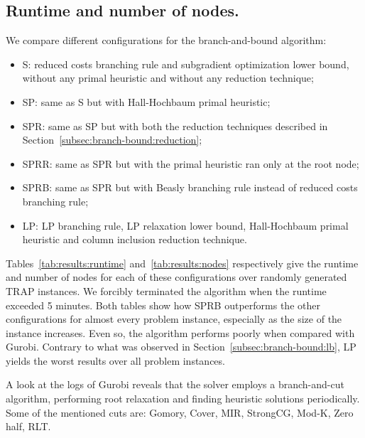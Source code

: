 \documentclass[runningheads]{llncs}
\begin{document}
\subsection{Runtime and number of nodes.} We compare different configurations for the branch-and-bound algorithm:
\begin{itemize}
  \item S: reduced costs branching rule and subgradient optimization lower bound, without any primal heuristic and without any reduction technique;
  \item SP: same as S but with Hall-Hochbaum primal heuristic;
  \item SPR: same as SP but with both the reduction techniques described in Section~\ref{subsec:branch-bound:reduction};
  \item SPRR: same as SPR but with the primal heuristic ran only at the root node;
  \item SPRB: same as SPR but with Beasly branching rule instead of reduced costs branching rule;
  \item LP: LP branching rule, LP relaxation lower bound, Hall-Hochbaum primal heuristic and column inclusion reduction technique.
\end{itemize}

Tables~\ref{tab:results:runtime} and~\ref{tab:results:nodes} respectively give the runtime and number of nodes for each of these configurations over randomly generated TRAP instances. We forcibly terminated the algorithm when the runtime exceeded 5 minutes. Both tables show how SPRB outperforms the other configurations for almost every problem instance, especially as the size of the instance increases. Even so, the algorithm performs poorly when compared with Gurobi. Contrary to what was observed in Section~\ref{subsec:branch-bound:lb}, LP yields the worst results over all problem instances. 

A look at the logs of Gurobi reveals that the solver employs a branch-and-cut algorithm, performing root relaxation and finding heuristic solutions periodically. Some of the mentioned cuts are: Gomory, Cover, MIR, StrongCG, Mod-K, Zero half, RLT.
\end{document}
